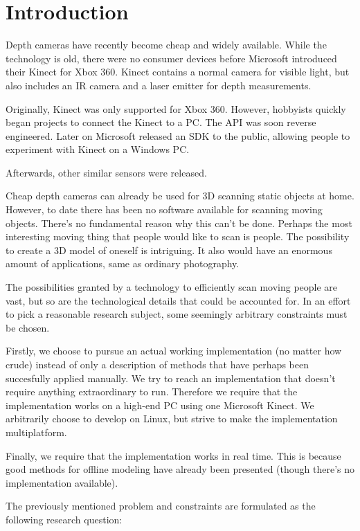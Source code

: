 \chapter{Introduction}

 Depth cameras have recently become cheap and widely available. While the technology is old, there were no consumer devices before Microsoft introduced their Kinect for Xbox 360. Kinect contains a normal camera for visible light, but also includes an IR camera and a laser emitter for depth measurements. 

Originally, Kinect was only supported for Xbox 360. However, hobbyists quickly began projects to connect the Kinect to a PC. The API was soon reverse engineered. Later on Microsoft released an SDK to the public, allowing people to experiment with Kinect on a Windows PC.

Afterwards, other similar sensors were released. 

Cheap depth cameras can already be used for 3D scanning static objects at home. However, to date there has been no software available for scanning moving objects. There's no fundamental reason why this can't be done. Perhaps the most interesting moving thing that people would like to scan is people. The possibility to create a 3D model of oneself is intriguing. It also would have an enormous amount of applications, same as ordinary photography.


The possibilities granted by a technology to efficiently scan moving people are vast, but so are the technological details that could be accounted for. In an effort to pick a reasonable research subject, some seemingly arbitrary constraints must be chosen.

Firstly, we choose to pursue an actual working implementation (no matter how crude) instead of only a description of methods that have perhaps been succesfully applied manually. We try to reach an implementation that doesn't require anything extraordinary to run. Therefore we require that the implementation works on a high-end PC using one Microsoft Kinect. We arbitrarily choose to develop on Linux, but strive to make the implementation multiplatform.

Finally, we require that the implementation works in real time. This is because good methods for offline modeling have already been presented (though there's no implementation available).

The previously mentioned problem and constraints are formulated as the following research question:

